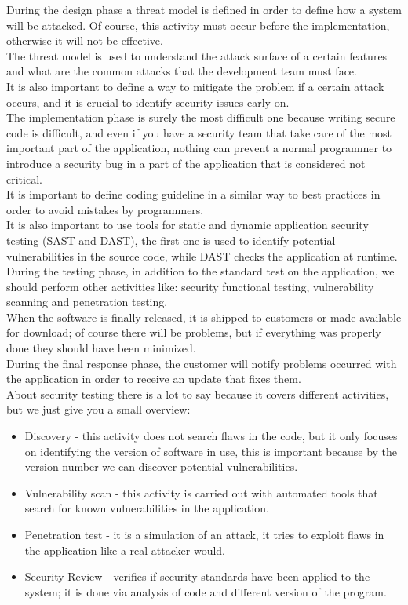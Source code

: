 During the design phase a threat model is defined in order to define how a system will be attacked. Of course, this
activity must occur before the implementation, otherwise it will not be effective.\\
The threat model is used to understand the attack surface of a certain features and what are the common attacks that
the development team must face.\\
It is also important to define a way to mitigate the problem if a certain attack occurs, and it is crucial to identify
security issues early on.\\

The implementation phase is surely the most difficult one because writing secure code is difficult, and even if you have
a security team that take care of the most important part of the application, nothing can prevent a normal programmer to introduce a security bug in a part of the application that is considered not critical.\\
It is important to define coding guideline in a similar way to best practices in order to avoid mistakes by programmers.\\
It is also important to use tools for static and dynamic application security testing (SAST and DAST), the first one is used to
identify potential vulnerabilities in the source code, while DAST checks the application at runtime.\\

During the testing phase, in addition to the standard test on the application, we should perform other activities like:
security functional testing, vulnerability scanning and penetration testing.\\ 

When the software is finally released, it is shipped to customers or made available for download; of course there will be
problems, but if everything was properly done they should have been minimized.\\
During the final response phase, the customer will notify problems occurred with the application in order to receive
an update that fixes them.\\

About security testing there is a lot to say because it covers different activities, but we just give you a small overview:
\begin{itemize}
	\item Discovery - this activity does not search flaws in the code, but it only focuses on identifying the version of software in use, this is important because by the version number we can discover potential vulnerabilities.
	\item Vulnerability scan - this activity is carried out with automated tools that search for
	known vulnerabilities in the application.
	\item Penetration test - it is a simulation of an attack, it tries to exploit flaws in the application like a real attacker would.
	\item Security Review - verifies if security standards have been applied to the system; it is
	done via analysis of code and different version of the program.
\end{itemize}



